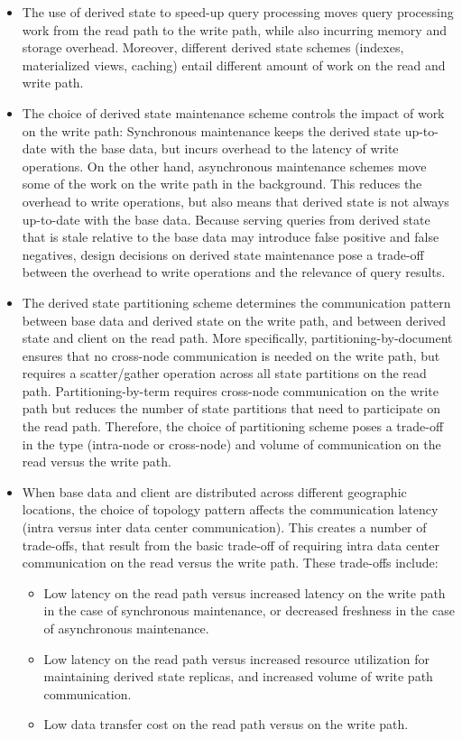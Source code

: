 \begin{itemize}
  \item The use of derived state to speed-up query processing moves query processing work from the read path to the write
  path, while also incurring memory and storage overhead.
  Moreover, different derived state schemes (indexes, materialized views, caching) entail different amount of work
  on the read and write path.

  \item The choice of derived state maintenance scheme controls the impact of work on the write path:
  Synchronous maintenance keeps the derived state up-to-date with the base data,
  but incurs overhead to the latency of write operations.
  On the other hand, asynchronous maintenance schemes move some of the work on the write path in the background.
  This reduces the overhead to write operations, but also means that derived state is not always up-to-date with the base
  data.
  Because serving queries from derived state that is stale relative to the base data may introduce false positive and
  false negatives,
  design decisions on derived state maintenance pose a trade-off between the overhead to write operations
  and the relevance of query results.

  \item The derived state partitioning scheme determines the communication pattern between base data and derived state
  on the write path, and between derived state and client on the read path.
  More specifically, partitioning-by-document ensures that no cross-node communication is needed on the write path,
  but requires a scatter/gather operation across all state partitions on the read path.
  Partitioning-by-term requires cross-node communication on the write path but reduces the number of state partitions
  that need to participate on the read path.
  Therefore, the choice of partitioning scheme poses a trade-off in the type (intra-node or cross-node) and volume
  of communication on the read versus the write path.

  \item When base data and client are distributed across different geographic locations,
  the choice of topology pattern affects the communication latency (intra versus inter data center communication).
  This creates a number of trade-offs, that result from the basic trade-off of requiring intra data center communication
  on the read versus the write path.
  These trade-offs include:
  \begin{itemize}
    \item Low latency on the read path versus increased latency on the write path in the case of synchronous maintenance,
    or decreased freshness in the case of asynchronous maintenance.
    \item Low latency on the read path versus increased resource utilization for maintaining derived state replicas,
    and increased volume of write path communication.
    \item Low data transfer cost on the read path versus on the write path.
  \end{itemize}

\end{itemize}